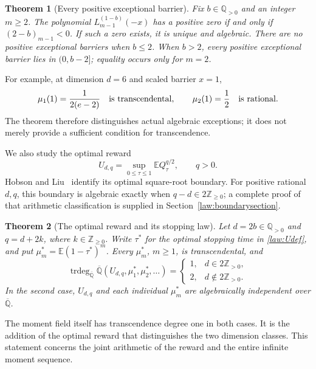 \documentclass[11pt,a4paper]{article}
\newcommand{\Q}{\mathbb Q}
\newcommand{\Qbar}{\overline{\mathbb Q}}
\DeclareMathOperator{\trdeg}{trdeg}
\newtheorem{theorem}{Theorem}[section]
\theoremstyle{definition}
\theoremstyle{remark}
\numberwithin{equation}{section}
\begin{document}
\begin{theorem}[Every positive exceptional barrier]\label{law:exceptions}
Fix $b\in\Q_{>0}$ and an integer $m\geq2$.
The polynomial $L_{m-1}^{(1-b)}(-x)$ has a positive zero if and only if
$(2-b)_{m-1}<0$. If such a zero exists, it is unique and algebraic.
There are no positive exceptional barriers when $b\leq2$.
When $b>2$, every positive exceptional barrier lies in $(0,b-2]$;
equality occurs only for $m=2$.
\end{theorem}

For example, at dimension $d=6$ and scaled barrier $x=1$,
\begin{equation}\label{law:rationalexample}
 \mu_1(1)=\frac1{2(e-2)}\quad\hbox{is transcendental},
 \qquad \mu_2(1)=\frac12\quad\hbox{is rational}.
\end{equation}
The theorem therefore distinguishes actual algebraic exceptions; it
does not merely provide a sufficient condition for transcendence.

We also study the optimal reward
\begin{equation}\label{law:Udef}
 U_{d,q}=\sup_{0\leq\tau\leq1}\mathbb{E} Q_\tau^{q/2},\qquad q>0.
\end{equation}
Hobson and Liu~\cite{HL} identify its optimal square-root boundary.
For positive rational $d,q$, this boundary is algebraic exactly when
$q-d\in2\mathbb Z_{\geq0}$; a complete proof of that arithmetic
classification is supplied in Section~\ref{law:boundarysection}.

\begin{theorem}[The optimal reward and its stopping law]\label{law:jointmain}
Let $d=2b\in\Q_{>0}$ and $q=d+2k$, where
$k\in\mathbb Z_{\geq0}$. Write $\tau^*$ for the optimal stopping time
in \eqref{law:Udef}, and put $\mu_m^*=\mathbb{E}(1-\tau^*)^m$.
Every $\mu_m^*$, $m\geq1$, is transcendental, and
\begin{equation}\label{law:jointclassification}
 \trdeg_{\Qbar}\Qbar(U_{d,q},\mu_1^*,\mu_2^*,\ldots)
 =\begin{cases}
 1,&d\in2\mathbb Z_{>0},\\
 2,&d\notin2\mathbb Z_{>0}.
 \end{cases}
\end{equation}
In the second case, $U_{d,q}$ and each individual $\mu_m^*$ are
algebraically independent over $\Qbar$.
\end{theorem}

The moment field itself has transcendence degree one in both cases.
It is the addition of the optimal reward that distinguishes the two
dimension classes. This statement concerns the joint arithmetic of
the reward and the entire infinite moment sequence.
\end{document}
